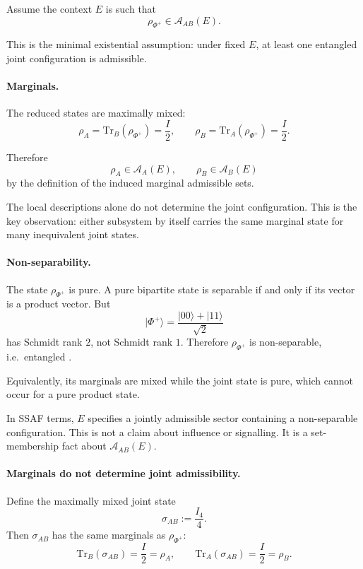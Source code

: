 \documentclass[aps,prx,onecolumn,11pt]{revtex4-2}
\theoremstyle{plain}
\theoremstyle{definition}
\theoremstyle{remark}
\begin{document}
Assume the context \(E\) is such that
\begin{equation}
\rho_{\Phi^+}\in\mathcal A_{AB}(E).
\label{eq:two_qubit_phi_plus_admissible}
\end{equation}

This is the minimal existential assumption: under fixed \(E\), at least
one entangled joint configuration is admissible.

\paragraph{Marginals.}

The reduced states are maximally mixed:
\[
\rho_A
=
\mathrm{Tr}_B(\rho_{\Phi^+})
=
\frac{I}{2},
\qquad
\rho_B
=
\mathrm{Tr}_A(\rho_{\Phi^+})
=
\frac{I}{2}.
\]

Therefore
\[
\rho_A\in\mathcal A_A(E),
\qquad
\rho_B\in\mathcal A_B(E)
\]
by the definition of the induced marginal admissible sets.

The local descriptions alone do not determine the joint configuration.
This is the key observation: either subsystem by itself carries the
same marginal state for many inequivalent joint states.

\paragraph{Non-separability.}

The state \(\rho_{\Phi^+}\) is pure. A pure bipartite state is
separable if and only if its vector is a product vector. But
\[
|\Phi^+\rangle
=
\frac{|00\rangle+|11\rangle}{\sqrt2}
\]
has Schmidt rank \(2\), not Schmidt rank \(1\). Therefore
\(\rho_{\Phi^+}\) is non-separable, i.e.\ entangled
\cite{Horodecki2009,Watrous2018}.

Equivalently, its marginals are mixed while the joint state is pure,
which cannot occur for a pure product state.

In SSAF terms, \(E\) specifies a jointly admissible sector containing a
non-separable configuration. This is not a claim about influence or
signalling. It is a set-membership fact about \(\mathcal A_{AB}(E)\).

\paragraph{Marginals do not determine joint admissibility.}

Define the maximally mixed joint state
\[
\sigma_{AB}
:=
\frac{I_4}{4}.
\]
Then \(\sigma_{AB}\) has the same marginals as \(\rho_{\Phi^+}\):
\[
\mathrm{Tr}_B(\sigma_{AB})=\frac{I}{2}=\rho_A,
\qquad
\mathrm{Tr}_A(\sigma_{AB})=\frac{I}{2}=\rho_B.
\]
\end{document}

